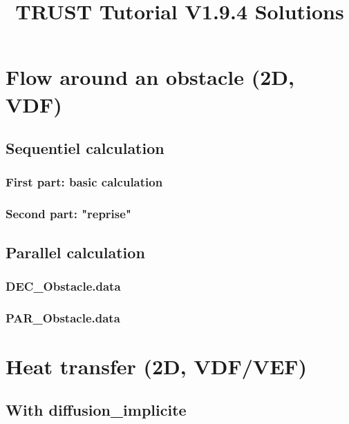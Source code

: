 \documentclass[english]{article}
\begin{document}
\title{TRUST Tutorial V1.9.4 Solutions}
\maketitle
\tableofcontents{}
\newpage

\section{Flow around an obstacle (2D, VDF)}
\subsection{Sequentiel calculation}
\subsubsection{First part: basic calculation}

\subsubsection{Second part: "reprise"}


\subsection{Parallel calculation}
\subsubsection{DEC\_Obstacle.data}

\subsubsection{PAR\_Obstacle.data}



\section{Heat transfer (2D, VDF/VEF)}
\subsection{With diffusion\_implicite}

\end{document}
